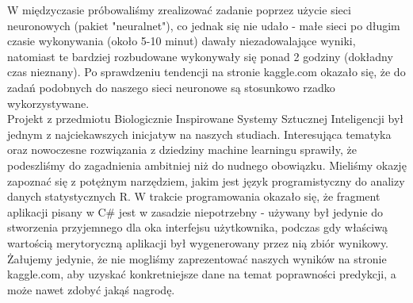 \documentclass[a4paper,twoside]{article}
\begin{document}
W międzyczasie próbowaliśmy zrealizować zadanie poprzez użycie sieci neuronowych (pakiet "neuralnet"), co jednak się nie udało - małe sieci po długim czasie wykonywania (około 5-10 minut) dawały niezadowalające wyniki, natomiast te bardziej rozbudowane wykonywały się ponad 2 godziny (dokładny czas nieznany). Po sprawdzeniu tendencji na stronie kaggle.com okazało się, że do zadań podobnych do naszego sieci neuronowe są stosunkowo rzadko wykorzystywane.\\

Projekt z przedmiotu Biologicznie Inspirowane Systemy Sztucznej Inteligencji był jednym z najciekawszych inicjatyw na naszych studiach. Interesująca tematyka oraz nowoczesne rozwiązania z dziedziny machine learningu sprawiły, że podeszliśmy do zagadnienia ambitniej niż do nudnego obowiązku. Mieliśmy okazję zapoznać się z potężnym narzędziem, jakim jest język programistyczny do analizy danych statystycznych R. W trakcie programowania okazało się, że fragment aplikacji pisany w C\# jest w zasadzie niepotrzebny - używany był jedynie do stworzenia przyjemnego dla oka interfejsu użytkownika, podczas gdy właściwą wartością merytoryczną aplikacji był wygenerowany przez nią zbiór wynikowy. Żałujemy jedynie, że nie mogliśmy zaprezentować naszych wyników na stronie kaggle.com, aby uzyskać konkretniejsze dane na temat poprawności predykcji, a może nawet zdobyć jakąś nagrodę.

\theendnotes
\end{document}

